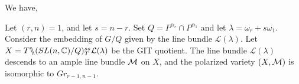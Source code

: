 We have,
\begin{theorem}
Let $(r,n)=1$, and let $s=n-r$. Set $Q = P^{\alpha_r} \cap P^{\alpha_1}$ and let $\lambda = \omega_r + s\omega_1$. Consider the embedding of $G/Q$ given by the line bundle ${\mathcal L}(\lambda)$. Let $X = T \backslash\mkern-6mu\backslash (SL(n,\mathbb{C})/Q)^{ss}_T {\cal L}(\lambda)$ be the GIT quotient. The line bundle ${\mathcal L}(\lambda)$ descends to an ample line bundle ${\cal M}$ on $X$, and the polarized variety $(X,{\cal M})$ is isomorphic to $Gr_{r-1, n-1}$.

\end{theorem}



%
